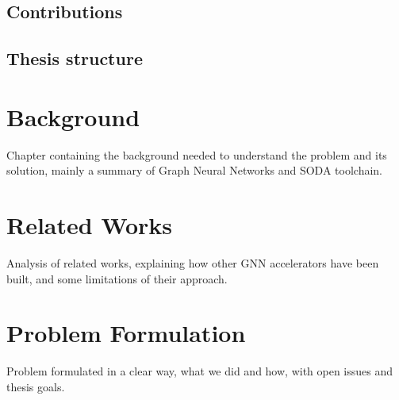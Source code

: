 \documentclass{Configuration_Files/PoliMi3i_thesis}
\begin{document}
    \section{Contributions}


    \section{Thesis structure}







    \chapter{Background}
    \label{ch:chapter_two}%

    Chapter containing the background needed to understand the problem and its solution, mainly a summary
    of Graph Neural Networks and SODA toolchain.



    \chapter{Related Works}
    \label{ch:chapter_three}%

    Analysis of related works, explaining how other GNN accelerators have been built, and some
    limitations of their approach.



    \chapter{Problem Formulation}
    \label{ch:chapter_four}%

    Problem formulated in a clear way, what we did and how, with open issues and thesis goals.
\end{document}
